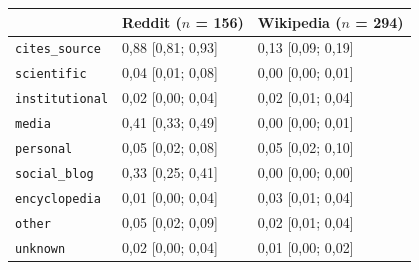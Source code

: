 \begin{tabular}{lll}
\toprule
 & Reddit ($n$ = 156) & Wikipedia ($n$ = 294) \\
\midrule
\texttt{cites\_source} & 0{,}88 [0{,}81; 0{,}93] & 0{,}13 [0{,}09; 0{,}19] \\
\midrule
\texttt{scientific} & 0{,}04 [0{,}01; 0{,}08] & 0{,}00 [0{,}00; 0{,}01] \\
\texttt{institutional} & 0{,}02 [0{,}00; 0{,}04] & 0{,}02 [0{,}01; 0{,}04] \\
\texttt{media} & 0{,}41 [0{,}33; 0{,}49] & 0{,}00 [0{,}00; 0{,}01] \\
\texttt{personal} & 0{,}05 [0{,}02; 0{,}08] & 0{,}05 [0{,}02; 0{,}10] \\
\texttt{social\_blog} & 0{,}33 [0{,}25; 0{,}41] & 0{,}00 [0{,}00; 0{,}00] \\
\texttt{encyclopedia} & 0{,}01 [0{,}00; 0{,}04] & 0{,}03 [0{,}01; 0{,}04] \\
\texttt{other} & 0{,}05 [0{,}02; 0{,}09] & 0{,}02 [0{,}01; 0{,}04] \\
\texttt{unknown} & 0{,}02 [0{,}00; 0{,}04] & 0{,}01 [0{,}00; 0{,}02] \\
\bottomrule
\end{tabular}
